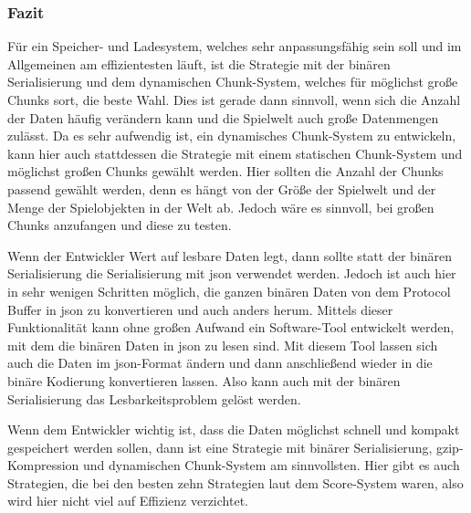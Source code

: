 \subsubsection{Fazit}
Für ein Speicher- und Ladesystem, welches sehr anpassungsfähig sein soll und im Allgemeinen am effizientesten läuft, ist die Strategie mit der binären Serialisierung und dem dynamischen Chunk-System, welches für möglichst große Chunks sort, die beste Wahl. Dies ist gerade dann sinnvoll, wenn sich die Anzahl der Daten häufig verändern kann und die Spielwelt auch große Datenmengen zulässt. Da es sehr aufwendig ist, ein dynamisches Chunk-System zu entwickeln, kann hier auch stattdessen die Strategie mit einem statischen Chunk-System und möglichst großen Chunks gewählt werden. Hier sollten die Anzahl der Chunks passend gewählt werden, denn es hängt von der Größe der Spielwelt und der Menge der Spielobjekten in der Welt ab. Jedoch wäre es sinnvoll, bei großen Chunks anzufangen und diese zu testen.    

Wenn der Entwickler Wert auf lesbare Daten legt, dann sollte statt der binären Serialisierung die Serialisierung mit \ac{json} verwendet werden. Jedoch ist auch hier in sehr wenigen Schritten möglich, die ganzen binären Daten von dem Protocol Buffer in \ac{json} zu konvertieren und auch anders herum.\cite{baeldungProtobufToJson} Mittels dieser Funktionalität kann ohne großen Aufwand ein Software-Tool entwickelt werden, mit dem die binären Daten in \ac{json} zu lesen sind. Mit diesem Tool lassen sich auch die Daten im \ac{json}-Format ändern und dann anschließend wieder in die binäre Kodierung konvertieren lassen. Also kann auch mit der binären Serialisierung das  Lesbarkeitsproblem gelöst werden.

Wenn dem Entwickler wichtig ist, dass die Daten möglichst schnell und kompakt gespeichert werden sollen, dann ist eine Strategie mit binärer Serialisierung, \ac{gzip}-Kompression und dynamischen Chunk-System am sinnvollsten. Hier gibt es auch Strategien, die bei den besten zehn Strategien laut dem Score-System waren, also wird hier nicht viel auf Effizienz verzichtet.